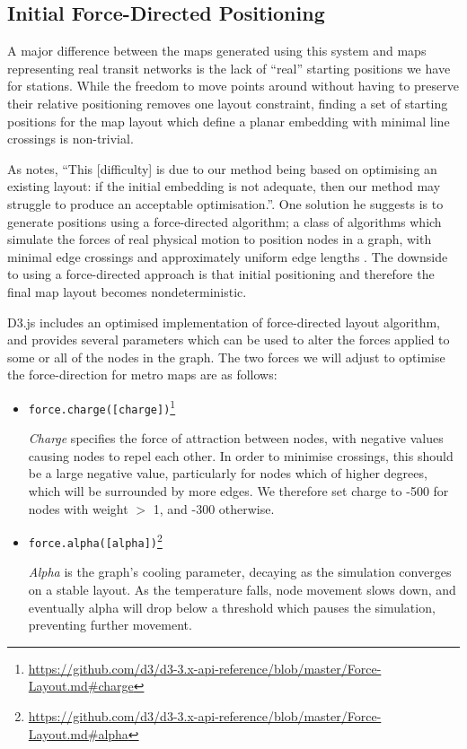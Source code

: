 \subsection{Initial Force-Directed Positioning}

A major difference between the maps generated using this system and maps representing real transit networks is the lack of ``real'' starting positions we have for stations. While the freedom to move points around without having to preserve their relative positioning removes one layout constraint, finding a set of starting positions for the map layout which define a planar embedding with minimal line crossings is non-trivial. 

As \citeauthor{AutomaticMetroMapLayoutThesis} notes, ``This [difficulty] is due to our method being based on optimising an existing layout: if the initial embedding is not adequate, then our method may struggle to produce an acceptable optimisation.''\cite[p.210]{AutomaticMetroMapLayoutThesis}. One solution he suggests is to generate positions using a force-directed algorithm; a class of algorithms which simulate the forces of real physical motion to position nodes in a graph, with minimal edge crossings and approximately uniform edge lengths \citep{springembedders}. The downside to using a force-directed approach is that initial positioning and therefore the final map layout becomes nondeterministic. 

D3.js includes an optimised implementation of  force-directed layout algorithm, and provides several parameters which can be used to alter the forces applied to some or all of the nodes in the graph. The two forces we will adjust to optimise the force-direction for metro maps are as follows:
\begin{itemize}
\item\texttt{force.charge([charge])}\footnote{\url{https://github.com/d3/d3-3.x-api-reference/blob/master/Force-Layout.md\#charge}}\par
	\textit{Charge} specifies the force of attraction between nodes, with negative values causing nodes to repel each other. In order to minimise crossings, this should be a large negative value, particularly for nodes which of higher degrees, which will be surrounded by more edges. We therefore set charge to -500 for nodes with weight $>$ 1, and -300 otherwise. 

\item\texttt{force.alpha([alpha])}\footnote{\url{https://github.com/d3/d3-3.x-api-reference/blob/master/Force-Layout.md\#alpha}}\par
	\textit{Alpha} is the graph's cooling parameter, decaying as the simulation converges on a stable layout. As the temperature falls, node movement slows down, and eventually alpha will drop below a threshold which pauses the simulation, preventing further movement. 
\end{itemize}

